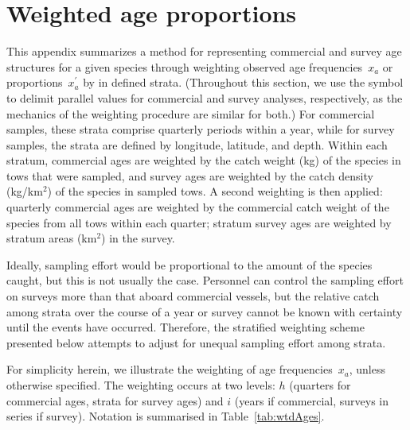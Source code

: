 \clearpage

\chapter{Weighted age proportions}

This appendix summarizes a method for representing commercial and survey age structures for a given species through weighting observed age frequencies~$x_a$ or proportions~$x^\prime_a$ by  in defined strata. 
(Throughout this section, we use the symbol \sQuote{$\Vert$} to delimit parallel values for commercial and survey analyses, respectively, as the mechanics of the weighting procedure are similar for both.) 
For commercial samples, these strata comprise quarterly periods within a year, while for survey samples, the strata are defined by longitude, latitude, and depth. 
Within each stratum, commercial ages are weighted by the catch weight (kg) of the species in tows that were sampled, and survey ages are weighted by the catch density (kg/km$^2$) of the species in sampled tows. 
A second weighting is then applied: quarterly commercial ages are weighted by the commercial catch weight of the species from all tows within each quarter; stratum survey ages are weighted by stratum areas (km$^2$) in the survey. 

Ideally, sampling effort would be proportional to the amount of the species caught, but this is not usually the case. 
Personnel can control the sampling effort on surveys more than that aboard commercial vessels, but the relative catch among strata over the course of a year or survey cannot be known with certainty until the events have occurred. 
Therefore, the stratified weighting scheme presented below attempts to adjust for unequal sampling effort among strata.

For simplicity herein, we illustrate the weighting of age frequencies~$x_a$, unless otherwise specified. 
The weighting occurs at two levels: $h$ (quarters for commercial ages, strata for survey ages) and $i$ (years if commercial, surveys in series if survey). 
Notation is summarised in Table~\ref{tab:wtdAges}.

